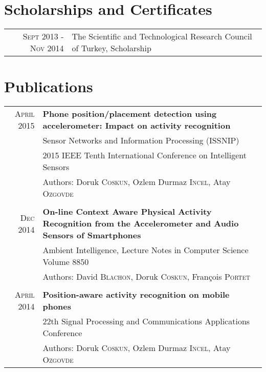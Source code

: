 \documentclass[a4paper,10pt]{article} %
\begin{document}

\section{Scholarships and Certificates}

\begin{tabular}{r|p{13cm}}
\textsc{Sept 2013 - Nov 2014}  & The Scientific and Technological Research Council of Turkey, Scholarship \normalsize\\


\end{tabular}


\section{Publications}

\begin{tabular}{r|p{14cm}}
\textsc{April} 2015 &\normalsize\textbf {Phone position/placement detection using accelerometer: Impact on activity recognition} \\
& Sensor Networks and Information Processing (ISSNIP) \\
& 2015 IEEE Tenth International Conference on Intelligent Sensors \\
& Authors: Doruk \textsc{Coskun}, Ozlem Durmaz \textsc{Incel}, Atay \textsc{Ozgovde} \normalsize\\ \\

\textsc{Dec} 2014 &\normalsize\textbf {On-line Context Aware Physical Activity Recognition from the Accelerometer and Audio Sensors of Smartphones} \\
& Ambient Intelligence, Lecture Notes in Computer Science Volume 8850 \\
& Authors: David \textsc{Blachon}, Doruk \textsc{Coskun}, François \textsc{Portet} \normalsize\\ \\

\textsc{April} 2014 &\normalsize\textbf {Position-aware activity recognition on mobile phones} \\
& 22th Signal Processing and Communications Applications Conference \\
& Authors: Doruk \textsc{Coskun}, Ozlem Durmaz \textsc{Incel}, Atay \textsc{Ozgovde}


\end{tabular}
\end{document}
